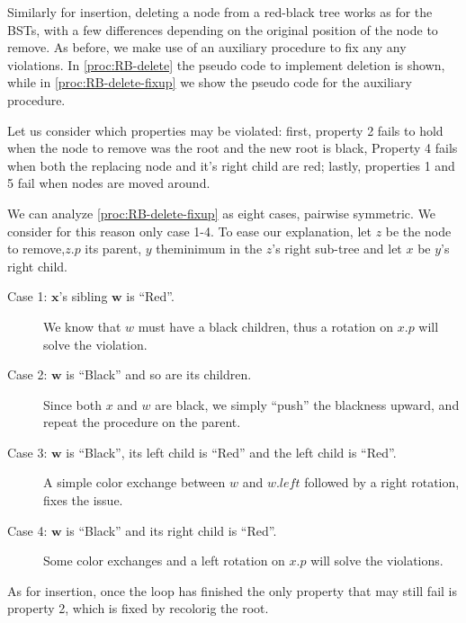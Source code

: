 \documentclass{subfiles}
\begin{document}
\label{sec:RB-delete}
    Similarly for insertion, deleting a node from a red-black tree works as for the BSTs,
        with a few differences depending on the original position of the node to remove.
        As before, we make use of an auxiliary procedure to fix any any violations.
        In \autoref{proc:RB-delete} the pseudo code to implement deletion is shown,
        while in \autoref{proc:RB-delete-fixup} we show the pseudo code for the auxiliary procedure.

    Let us consider which properties may be violated: first,
        property 2 fails to hold when the node to remove was the root and the new root is black,
        Property 4 fails when both the replacing node and it's right child are red;
        lastly, properties 1 and 5 fail when nodes are moved around.

    

    We can analyze \autoref{proc:RB-delete-fixup} as eight cases, pairwise symmetric.
        We consider for this reason only case 1-4.
        To ease our explanation, let \(z\) be the node to remove,\(z.p\) its parent, 
        \(y\) theminimum in the \(z\)'s right sub-tree and let \(x\) be \(y\)'s right child.
        \begin{description}
            \item [Case 1: \(\mathbf{x}\)'s sibling \(\mathbf{w}\) is ``Red''.]
                We know that \(w\) must have a black children,
                thus a rotation on \(x.p\) will solve the violation.

            \item [Case 2: \(\mathbf{w}\) is ``Black'' and so are its children.]
                Since both \(x\) and \(w\) are black, we simply ``push'' the blackness
                upward, and repeat the procedure on the parent.

            \item [Case 3: \(\mathbf{w}\) is ``Black'', its left child is ``Red'' and the left child is ``Red''.]
                A simple color exchange between \(w\) and \(w.left\) followed by a right rotation,
                fixes the issue.

            \item [Case 4: \(\mathbf{w}\) is ``Black'' and its right child is ``Red''.]
                Some color exchanges and a left rotation on \(x.p\) will solve the violations.
        \end{description}
        As for insertion, once the loop has finished the only property that may still fail is property
            2, which is fixed by recolorig the root.

        
        
\end{document}
